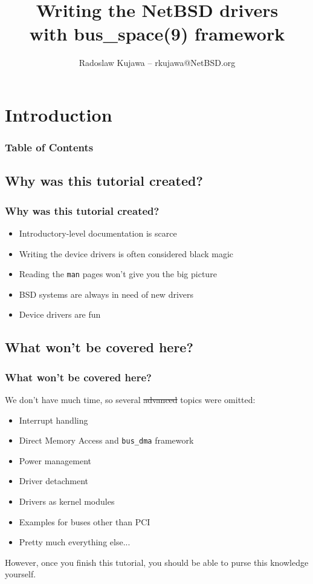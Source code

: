 \documentclass[dvipsnames,table]{beamer}
\title{Writing the NetBSD drivers\\with bus\_space(9) framework}
\author{Radoslaw Kujawa -- rkujawa@NetBSD.org}
\institute{The NetBSD Foundation}
\begin{document}
\section{Introduction}

\begin{frame}
\titlepage
\end{frame}

\begin{frame}[allowframebreaks]
\frametitle{Table of Contents}
{
\hypersetup{colorlinks=true,linkcolor=black,urlcolor=NetBSD-orange}
\tableofcontents
}
\end{frame}

\subsection{Why was this tutorial created?}

\begin{frame}
\frametitle{Why was this tutorial created?}
\begin{itemize}
	\item Introductory-level documentation is scarce
	\item Writing the device drivers is often considered black magic
	\item Reading the {\tt man} pages won't give you the big picture
	\item BSD systems are always in need of new drivers
	\item Device drivers are fun {\Large \smiley}
\end{itemize}
\end{frame}

\subsection{What won't be covered here?}

\begin{frame}
\frametitle{What won't be covered here?}
We don't have much time, so several \sout{advanced} topics were omitted:
\begin{itemize}
	\item Interrupt handling
	\item Direct Memory Access and {\tt bus\_dma} framework
	\item Power management
	\item Driver detachment
	\item Drivers as kernel modules
	\item Examples for buses other than PCI
	\item Pretty much everything else...
\end{itemize}
However, once you finish this tutorial, you should be able to purse this knowledge yourself.
\end{frame}
\end{document}
